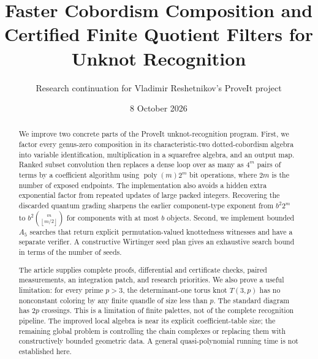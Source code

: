 \documentclass[11pt,letterpaper]{article}
\title{\color{navy}\bfseries Faster Cobordism Composition and Certified Finite Quotient Filters for Unknot Recognition}
\author{Research continuation for Vladimir Reshetnikov's ProveIt project}
\date{8 October 2026}
\theoremstyle{definition}
\theoremstyle{remark}
\newcommand{\poly}{\operatorname{poly}}
\newcommand{\floor}[1]{\left\lfloor#1\right\rfloor}
\begin{document}
\maketitle
\begin{abstract}
We improve two concrete parts of the ProveIt unknot-recognition program.
First, we factor every genus-zero
composition in its characteristic-two dotted-cobordism algebra into variable
identification, multiplication in a squarefree algebra, and an output map.
Ranked subset convolution then replaces a dense loop over as many as
$4^m$ pairs of terms by a coefficient algorithm using
$\poly(m)2^m$ bit operations, where $2m$ is the number of exposed endpoints.
The implementation also avoids a hidden extra exponential factor from
repeated updates of large packed integers. Recovering the discarded
quantum grading sharpens the earlier component-type exponent from
$b^2 2^m$ to $b^2\binom{m}{\floor{m/2}}$ for components with at most
$b$ objects. Second, we implement bounded
$A_5$ searches that return explicit permutation-valued knottedness witnesses
and have a separate verifier. A constructive Wirtinger seed plan gives an
exhaustive search bound in terms of the number of seeds.

The article supplies complete proofs, differential and certificate checks,
paired measurements, an integration patch, and research priorities. We also
prove a useful limitation: for every prime $p>3$, the determinant-one torus
knot $T(3,p)$ has no nonconstant coloring by any finite quandle of size less
than $p$. The standard diagram has $2p$ crossings. This is a limitation of
finite palettes, not of the complete recognition pipeline. The improved
local algebra is near its explicit coefficient-table size; the remaining
global problem is controlling the chain complexes or replacing them with
constructively bounded geometric data. A general quasi-polynomial running
time is not established here.
\end{abstract}
\thispagestyle{empty}
\clearpage
\tableofcontents
\clearpage








\end{document}
